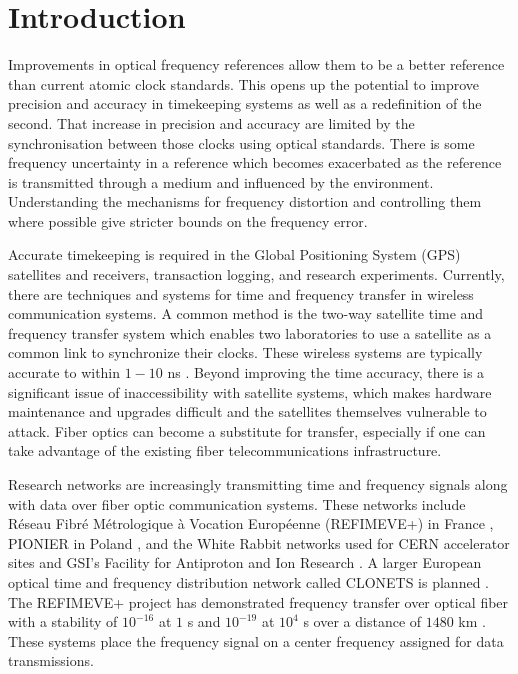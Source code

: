 \chapter{Introduction}

Improvements in optical frequency references allow them to be a better reference than current atomic clock standards. This opens up the potential to improve precision and accuracy in timekeeping systems as well as a redefinition of the second. That increase in precision and accuracy are limited by the synchronisation between those clocks using optical standards. There is some frequency uncertainty in a reference which becomes exacerbated as the reference is transmitted through a medium and influenced by the environment. Understanding the mechanisms for frequency distortion and controlling them where possible give stricter bounds on the frequency error.

Accurate timekeeping is required in the Global Positioning System (GPS) satellites and receivers, transaction logging, and research experiments. Currently, there are techniques and systems for time and frequency transfer in wireless communication systems.  A common method is the two-way satellite time and frequency transfer system which enables two laboratories to use a satellite as a common link to synchronize their clocks. These wireless systems are typically accurate to within $1-10$ ns \cite{Allan1980}.  Beyond improving the time accuracy, there is a significant issue of inaccessibility with satellite systems, which makes hardware maintenance and upgrades difficult and the satellites themselves vulnerable to attack.
Fiber optics can become a substitute for transfer, especially if one can take advantage of the existing fiber telecommunications infrastructure.


Research networks are increasingly transmitting time and frequency signals along with data over fiber optic communication systems. These networks include R\'eseau Fibr\'e M\'etrologique \`a Vocation Europ\'eenne (REFIMEVE+) in France \cite{cantin2017progress}, PIONIER in Poland \cite{Turza2017}, 
and the White Rabbit networks used for CERN accelerator sites and GSI's Facility for Antiproton and Ion Research \cite{Serrano2013}.  
A larger European optical time and frequency distribution network called CLONETS is planned \cite{CLONETS}.
The REFIMEVE+ project has demonstrated frequency transfer over optical fiber with a stability of $10^{-16}$ at $1$ s and $10^{-19}$ at $10^4$ s over a distance of $1480$ km \cite{cantin2017progress}. These systems place the frequency signal on a center frequency assigned for data transmissions. 

